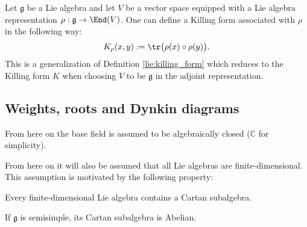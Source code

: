     \begin{construct}\label{lie:rho_killing_form}
        Let $\mathfrak{g}$ be a Lie algebra and let $V$ be a vector space equipped with a Lie algebra representation $\rho:\mathfrak{g}\rightarrow\End(V)$. One can define a Killing form associated with $\rho$ in the following way:
        \begin{gather}
            K_\rho(x,y) := \tr\big(\rho(x)\circ\rho(y)\big).
        \end{gather}
        This is a generalization of Definition \ref{lie:killing_form} which reduces to the Killing form $K$ when choosing $V$ to be $\mathfrak{g}$ in the adjoint representation.
    \end{construct}

\subsection{Weights, roots and Dynkin diagrams}\label{section:weights_roots}

    From here on the base field is assumed to be algebraically closed ($\mathbb{C}$ for simplicity).


    From here on it will also be assumed that all Lie algebras are finite-dimensional. This assumption is motivated by the following property:
    \begin{property}
        Every finite-dimensional Lie algebra contains a Cartan subalgebra.
    \end{property}
    \begin{property}
       If $\mathfrak{g}$ is semisimple, its Cartan subalgebra is Abelian.
    \end{property}


